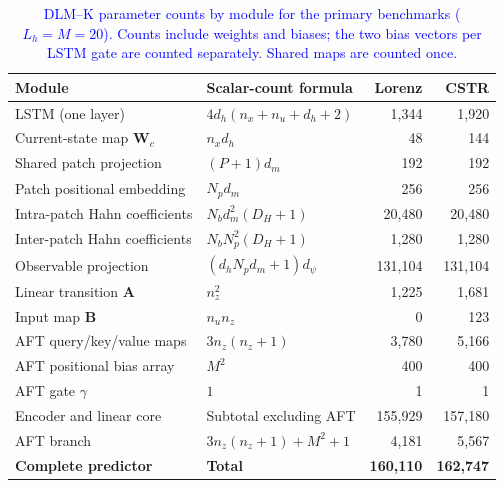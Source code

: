 \begin{table}[pos=!htbp]
\color{blue}
\caption{\textcolor{blue}{DLM--K parameter counts by module for the primary benchmarks ($L_h=M=20$). Counts include weights and biases; the two bias vectors per LSTM gate are counted separately. Shared maps are counted once.}}
\label{tab:dlm-module-parameters}
\centering\small
\setlength{\tabcolsep}{3pt}
\begin{tabular}{@{}p{.34\linewidth}p{.36\linewidth}rr@{}}
\toprule
Module & Scalar-count formula & Lorenz & CSTR \\
\midrule
LSTM (one layer) & $4d_h(n_x+n_u+d_h+2)$ & 1,344 & 1,920 \\
Current-state map $\bm W_c$ & $n_xd_h$ & 48 & 144 \\
Shared patch projection & $(P+1)d_m$ & 192 & 192 \\
Patch positional embedding & $N_pd_m$ & 256 & 256 \\
Intra-patch Hahn coefficients & $N_bd_m^2(D_H+1)$ & 20,480 & 20,480 \\
Inter-patch Hahn coefficients & $N_bN_p^2(D_H+1)$ & 1,280 & 1,280 \\
Observable projection & $(d_hN_pd_m+1)d_\psi$ & 131,104 & 131,104 \\
Linear transition $\bm A$ & $n_z^2$ & 1,225 & 1,681 \\
Input map $\bm B$ & $n_un_z$ & 0 & 123 \\
AFT query/key/value maps & $3n_z(n_z+1)$ & 3,780 & 5,166 \\
AFT positional bias array & $M^2$ & 400 & 400 \\
AFT gate $\gamma$ & $1$ & 1 & 1 \\
\midrule
Encoder and linear core & Subtotal excluding AFT & 155,929 & 157,180 \\
AFT branch & $3n_z(n_z+1)+M^2+1$ & 4,181 & 5,567 \\
\textbf{Complete predictor} & \textbf{Total} & \textbf{160,110} & \textbf{162,747} \\
\bottomrule
\end{tabular}
\end{table}


